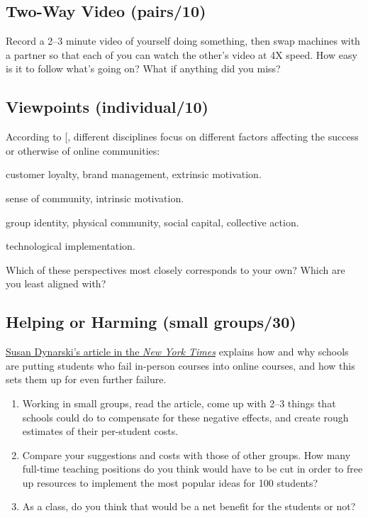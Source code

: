 \subsection{Two-Way Video (pairs/10)}\label{two-way-video-pairs10}

Record a 2--3 minute video of yourself doing something, then swap
machines with a partner so that each of you can watch the other's video
at 4X speed. How easy is it to follow what's going on? What if anything
did you miss?

\subsection{Viewpoints (individual/10)}\label{viewpoints-individual10}

According to {[}\protect[\hyperlink{b:Irib2009}{Irib2009}]{]}, different disciplines focus on
different factors affecting the success or otherwise of online
communities:

\begin{description}
\tightlist
\item[Business:]
customer loyalty, brand management, extrinsic motivation.
\item[Psychology:]
sense of community, intrinsic motivation.
\item[Sociology:]
group identity, physical community, social capital, collective
action.
\item[Computer Science:]
technological implementation.
\end{description}

Which of these perspectives most closely corresponds to your own? Which
are you least aligned with?

\subsection{Helping or Harming (small groups/30)}\label{helping-or-harming-small-groups30}

\href{https://www.nytimes.com/2018/01/19/business/online-courses-are-harming-the-students-who-need-the-most-help.html}{Susan Dynarski's article in the \emph{New York
Times}} explains how and why schools are
putting students who fail in-person courses into online courses, and
how this sets them up for even further failure.

\begin{enumerate}
\item
  Working in small groups, read the article, come up with 2--3 things
  that schools could do to compensate for these negative effects, and
  create rough estimates of their per-student costs.
\item
  Compare your suggestions and costs with those of other groups. How
  many full-time teaching positions do you think would have to be cut
  in order to free up resources to implement the most popular ideas
  for 100 students?
\item
  As a class, do you think that would be a net benefit for the
  students or not?
\end{enumerate}


